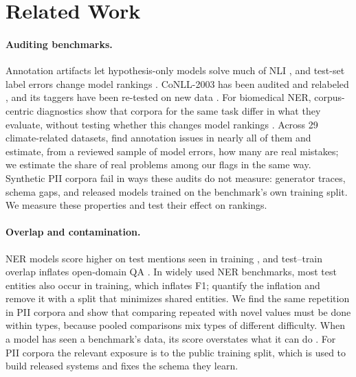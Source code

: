 \documentclass[11pt]{article}
\begin{document}
\section{Related Work}
\label{sec:related_work}

\paragraph{Auditing benchmarks.}
Annotation artifacts let hypothesis-only models solve much of NLI
\cite{gururangan-etal-2018-annotation}, and test-set label errors change
model rankings \cite{northcutt2021pervasive}. CoNLL-2003 has been
audited and relabeled \cite{reiss-etal-2020-identifying,
wang-etal-2019-crossweigh,rucker2023cleanconll}, and its taggers have
been re-tested on new data \cite{liu-ritter-2023-conll}. For biomedical
NER, corpus-centric diagnostics show that corpora for the same task
differ in what they evaluate, without testing whether this changes
model rankings \cite{leaman2026biomedical}. Across 29 climate-related
datasets, \citet{calamai-etal-2025-benchmarking} find annotation issues
in nearly all of them and estimate, from a reviewed sample of model
errors, how many are real mistakes; we estimate the share of real
problems among our flags in the same way. Synthetic PII corpora fail
in ways these audits do not measure: generator traces, schema gaps, and
released models trained on the benchmark's own training split. We
measure these properties and test their effect on rankings.

\paragraph{Overlap and contamination.}
NER models score higher on test mentions seen in training
\cite{augenstein2017generalisation,taille2020contextualized}, and
test--train overlap inflates open-domain QA
\cite{lewis-etal-2021-question}. In widely used NER benchmarks, most
test entities also occur in training, which inflates F1;
\citet{babl-etal-2025-random} quantify the inflation and remove it with a
split that minimizes shared entities. We find the same repetition in PII
corpora and show that comparing repeated with novel values must be done
within types, because pooled comparisons mix types of different
difficulty. When a model has seen a benchmark's data, its score
overstates what it can do \cite{sainz-etal-2023-nlp}. For PII corpora
the relevant exposure is to the public training split, which is used to
build released systems and fixes the schema they learn.
\end{document}
